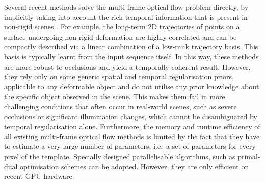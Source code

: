 Several recent methods solve the multi-frame optical flow problem directly, by 
implicitly taking into account the rich temporal information that is present in 
non-rigid scenes \cite{Irani02,Torresani:2001iw,Torresani:2002jn,tomasi2012dense,ricco2013video,Garg:2013hu}. 
For example, the long-term 2D trajectories of points on a surface undergoing non-rigid 
deformation are highly correlated and can be compactly described via a linear combination of a 
low-rank trajectory basis. This basis is typically learnt from the input sequence itself. In 
this way, these methods are more robust to occlusions and yield a temporally coherent 
result. However, they rely only on some generic spatial and temporal regularisation 
priors, applicable to any deformable object and do not utilise any prior knowledge 
about the specific object observed in the scene. This makes them fail in more challenging 
conditions that often occur in real-world scenes, such as severe occlusions or 
significant illumination changes, which cannot be disambiguated by temporal regularisation 
alone.
Furthermore, the memory and runtime efficiency of all existing multi-frame optical 
flow methods is limited by the fact that they have to estimate a very large number 
of parameters, i.e.~a set of parameters for every pixel of the template. Specially designed 
parallelisable algorithms, such as primal-dual optimisation schemes \cite{Wedel:DAGM:2009,Garg:2013hu} 
can be adopted. However, they are only efficient on recent GPU hardware.

